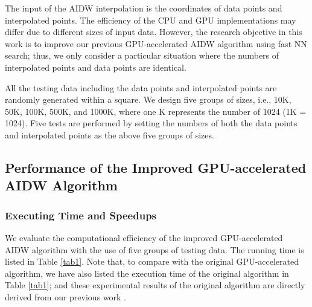\documentclass[final,5p,times,twocolumn,authoryear]{elsarticle}
\begin{document}
			The input of the AIDW interpolation is the coordinates of data points and 
			interpolated points. The efficiency of the CPU and GPU implementations may 
			differ due to different sizes of input data. However, the research objective 
			in this work is to improve our previous GPU-accelerated AIDW algorithm using 
			fast NN search; thus, we only consider a particular situation where the 
			numbers of interpolated points and data points are identical.
			
			All the testing data including the data points and interpolated points are 
			randomly generated within a square. We design five groups of sizes, i.e., 
			10K, 50K, 100K, 500K, and 1000K, where one K represents the number of 1024 
			(1K = 1024). Five tests are performed by setting the numbers of both the 
			data points and interpolated points as the above five groups of sizes.
			
			\subsection{Performance of the Improved GPU-accelerated AIDW Algorithm}
			\subsubsection{Executing Time and Speedups}
			
			We evaluate the computational efficiency of the improved GPU-accelerated 
			AIDW algorithm with the use of five groups of testing data. The running time 
			is listed in Table \ref{tab1}. Note that, to compare with the original 
			GPU-accelerated algorithm, we have also listed the execution time of the 
			original algorithm in Table \ref{tab1}; and these experimental results of the original algorithm are directly 
			derived from our previous work \citep{29DBLP:journals/corr/MeiXX15}.
			
\end{document}
